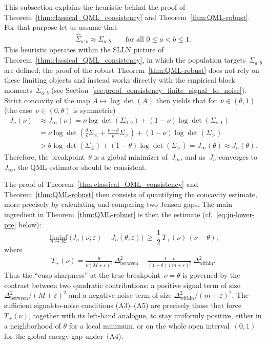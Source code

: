 \documentclass[10pt, letterpaper]{amsart}
\begin{document}
This subsection explains the heuristic behind the proof of Theorem~\ref{thm:classical_QML_consistency} and Theorem~\ref{thm:QML-robust}. For that purpose let us assume that
\begin{align}\label{equ:heuristic_QML_consistency}
    \widehat \Sigma_{a:b} \approx \Sigma_{a:b} \qquad \mbox{for all } 0 \leq a < b \leq 1.
\end{align}
This heuristic operates within the SLLN picture of Theorem~\ref{thm:classical_QML_consistency}, in which the population targets~$\Sigma_{a:b}$ are defined; the proof of the robust Theorem~\ref{thm:QML-robust} does not rely on these limiting objects and instead works directly with the empirical block moments~$\widehat\Sigma_{a:b}$ (see Section~\ref{sec:proof_consistency_finite_signal_to_noise}).
Strict concavity of the map $A\mapsto \log\det(A)$ then yields that for~$\nu \in (\theta,1)$ (the case~$\nu \in (0,\theta)$ is symmetric)
\begin{align}
    J_n(\nu) & \approx J_\infty (\nu) = \nu \log \det \left( \Sigma_{0:\nu} \right) + (1- \nu) \log \det \left(\Sigma_{\nu:1}\right) \\
        & = \nu \log \det \left( \frac{\theta}{\nu}\Sigma_{\leq} + \frac{\nu - \theta}{\nu} \Sigma_{>} \right) +  (1- \nu) \log \det \left(\Sigma_{>}\right)  \\
        & >   \theta \log \det \left( \Sigma_{\leq} \right) +   (1- \theta) \log \det \left(\Sigma_{>}\right) = J_\infty(\theta) \approx J_n(\theta).
\end{align}
Therefore, the breakpoint~$\theta$ is a global minimizer of~$J_\infty$, and as~$J_n$ converges to~$J_\infty$, the QML estimator should be consistent.

The proof of Theorem~\ref{thm:classical_QML_consistency} and Theorem~\ref{thm:QML-robust} then consists of quantifying the concavity estimate, more precisely by calculating and comparing two Jensen gaps. The main ingredient in Theorem~\ref{thm:QML-robust} is then the estimate (cf.~\eqref{eq:jn-lower-pre} below):
\[
\liminf_{n\to\infty}\bigl(J_n(\nu;\varepsilon)-J_n(\theta;\varepsilon)\bigr)
\ \ge\ \frac12\,T_+(\nu)\,(\nu-\theta),
\]
where
\begin{align}
\label{equ:curcial_estimate_robust_QML}
T_+(\nu)
=\frac{\theta}{\nu(M+\varepsilon)^2}\,\Delta_{\mathrm{between}}^2
-\frac{1-\nu}{(1-\theta)(m+\varepsilon)^2}\,\Delta_{\mathrm{within}}^2.
\end{align}
Thus the ``cusp sharpness'' at the true breakpoint~$\nu= \theta$ is governed by the contrast
between two quadratic contributions: a positive signal term of size $\Delta_{\mathrm{between}}^2/(M+\varepsilon)^2$ and a negative noise term of size $\Delta_{\mathrm{within}}^2/(m+\varepsilon)^2$.
The sufficient signal-to-noise conditions (A3)--(A5) are precisely those that force
$T_+(\nu)$, together with its left-hand analogue, to stay uniformly positive, either in a neighborhood of $\theta$ for a local minimum, or on
the whole open interval~$(0,1)$ for the global energy gap under~(A4).\medskip
\end{document}
